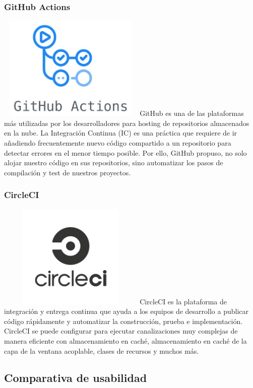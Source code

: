 \documentclass[twoside,twocolumn]{article}
\begin{document}
\subsubsection{GitHub Actions  }
\includegraphics[width=7cm, height=5cm]{imagenes/GithubActions.png}
GitHub es una de las plataformas más utilizadas por los desarrolladores para hosting de repositorios almacenados en la nube. La Integración Continua (IC) es una práctica que requiere de ir añadiendo frecuentemente nuevo código compartido a un repositorio para detectar errores en el menor tiempo posible. Por ello, GitHub propuso, no solo alojar nuestro código en sus repositorios, sino automatizar los pasos de compilación y test de nuestros proyectos. 
\subsubsection{CircleCI }
\includegraphics[width=7cm, height=5cm]{imagenes/CircleCI.png}
CircleCI es la plataforma de integración y entrega continua que ayuda a los equipos de desarrollo a publicar código rápidamente y automatizar la construcción, prueba e implementación. CircleCI se puede configurar para ejecutar canalizaciones muy complejas de manera eficiente con almacenamiento en caché, almacenamiento en caché de la capa de la ventana acoplable, clases de recursos y muchos más. 
\subsection{Comparativa de usabilidad }
\end{document}
